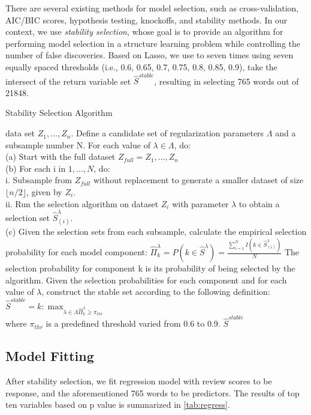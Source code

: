 \documentclass[12pt]{article}
\begin{document}
There are several existing methods for model selection, such as cross-validation, AIC/BIC scores, hypothesis testing, knockoffs, and stability methods. In our context, we use \textit{stability selection}\cite{meinshausen2010stability}, whose goal is to provide an algorithm for performing model selection in a structure learning problem while controlling the number of false discoveries. Based on Lasso, we use  to seven times using seven equally spaced thresholds (i.e., 0.6, 0.65, 0.7, 0.75, 0.8, 0.85, 0.9), take the intersect of the return variable set $\hat{S}^{stable}$, resulting in selecting 765 words out of 21848. 
\begin{algorithm}
	\caption{Stability Selection Algorithm}
	\label{algorithm}
	\begin{algorithmic}[1]
		\REQUIRE data set $Z_1, \dots, Z_n$.
		\STATE Define a candidate set of regularization parameters $\Lambda$ and a subsample number N.
		\STATE For each value of $\lambda \in \Lambda$, do:\\
		(a) Start with the full dataset $Z_{full} = Z_1, \dots, Z_n$\\
		(b) For each i in $1, \dots,N$, do:\\
		i. Subsample from $Z_{full}$ without replacement to generate a smaller dataset of
		size $\lfloor n/2 \rfloor$, given by $Z_{i}$.\\
		ii. Run the selection algorithm on dataset $Z_{i}$ with parameter $\lambda$ to obtain a
		selection set $\hat{S}_{(i)}^\lambda$.\\
		(c) Given the selection sets from each subsample, calculate the empirical selection
		probability for each model component:
		$\hat{\Pi}_k^\lambda=P(k \in \hat{S}^\lambda)=\frac{\sum_{i=1}^{N} I(k \in \hat{S}_{(i)}^\lambda)}{N}$
		The selection probability for component k is its probability of being selected by
		the algorithm.
		\STATE Given the selection probabilities for each component and for each value of $\lambda$, construct
		the stable set according to the following definition:\\
		$\hat{S}^{stable} = {k:\max_{\lambda \in \Lambda \hat{\Pi}_k^\lambda \geq \pi_{thr}}}$\\
		where $\pi_{thr}$ is a predefined threshold varied from 0.6 to 0.9.
		\RETURN $\hat{S}^{stable}$
	\end{algorithmic}
\end{algorithm}



\subsection{Model Fitting}
\label{subsec:mod}
After stability selection, we fit regression model with review scores to be response, and the aforementioned 765 words to be predictors. The results of top ten variables based on p value is summarized in \cref{tab:regress}. 
\end{document}
